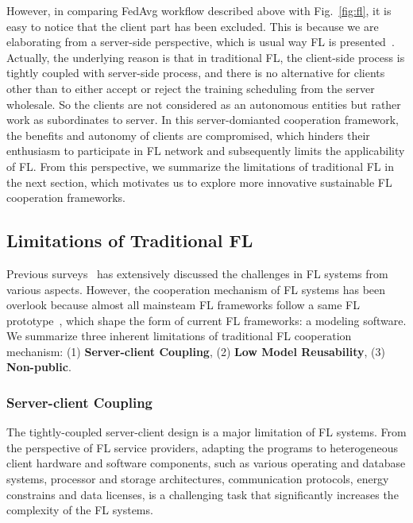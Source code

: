 However, in comparing FedAvg workflow described above with Fig.~\ref{fig:fl}, it is easy to notice that the client part has been excluded.
This is because we are elaborating from a server-side perspective, which is usual way FL is presented~\cite{mcmahan2017communication, li2020ditto, caldas2018leaf}.
Actually, the underlying reason is that in traditional FL, the client-side process is tightly coupled with server-side process, and there is no alternative for clients other than to either accept or reject the training scheduling from the server wholesale.
So the clients are not considered as an autonomous entities but rather work as subordinates to server.
In this server-domianted cooperation framework, the benefits and autonomy of clients are compromised, which hinders their enthusiasm to participate in FL network and subsequently limits the applicability of FL.
From this perspective, we summarize the limitations of traditional FL in the next section, which motivates us to explore more innovative sustainable FL cooperation frameworks.

\subsection{Limitations of Traditional FL}
Previous surveys~\cite{kairouz2021advances, zhang2022federated, alazab2021federated, nguyen2021federated, zhu2022blockchain, li2020federated, yang2019federated, tan2022towards} has extensively discussed the challenges in FL systems from various aspects.
However, the cooperation mechanism of FL systems has been overlook because almost all mainsteam FL frameworks follow a same FL prototype~\cite{mcmahan2017communication}, which shape the form of current FL frameworks: a modeling software.
We summarize three inherent limitations of traditional FL cooperation mechanism: (1) \textbf{Server-client Coupling}, (2) \textbf{Low Model Reusability}, (3) \textbf{Non-public}.

\subsubsection{Server-client Coupling} 
The tightly-coupled server-client design is a major limitation of FL systems. From the perspective of FL service providers, adapting the programs to heterogeneous client hardware and software components, such as various operating and database systems, processor and storage architectures, communication protocols, energy constrains and data licenses, is a challenging task that significantly increases the complexity of the FL systems. 
    
